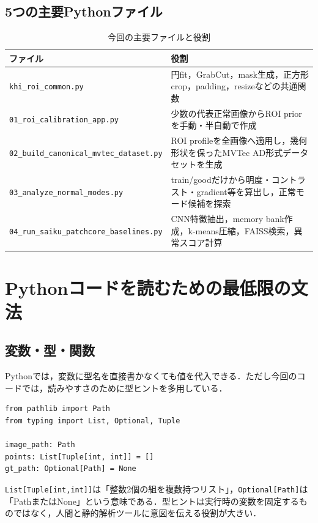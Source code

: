 \documentclass[a4paper,11pt]{ltjsreport}
\begin{document}
\section{5つの主要Pythonファイル}
\begin{table}[H]
\centering
\caption{今回の主要ファイルと役割}
\begin{tabularx}{\linewidth}{L{75mm} Y}
\toprule
ファイル & 役割 \\
\midrule
\texttt{khi\_roi\_common.py} & 円fit，GrabCut，mask生成，正方形crop，padding，resizeなどの共通関数 \\
\texttt{01\_roi\_calibration\_app.py} & 少数の代表正常画像からROI priorを手動・半自動で作成 \\
\texttt{02\_build\_canonical\_mvtec\_dataset.py} & ROI profileを全画像へ適用し，幾何形状を保ったMVTec AD形式データセットを生成 \\
\texttt{03\_analyze\_normal\_modes.py} & train/goodだけから明度・コントラスト・gradient等を算出し，正常モード候補を探索 \\
\texttt{04\_run\_saiku\_patchcore\_baselines.py} & CNN特徴抽出，memory bank作成，k-means圧縮，FAISS検索，異常スコア計算 \\
\bottomrule
\end{tabularx}
\end{table}

\chapter{Pythonコードを読むための最低限の文法}

\section{変数・型・関数}
Pythonでは，変数に型名を直接書かなくても値を代入できる．ただし今回のコードでは，読みやすさのために型ヒントを多用している．

\begin{lstlisting}
from pathlib import Path
from typing import List, Optional, Tuple

image_path: Path
points: List[Tuple[int, int]] = []
gt_path: Optional[Path] = None
\end{lstlisting}

\texttt{List[Tuple[int,int]]}は「整数2個の組を複数持つリスト」，\texttt{Optional[Path]}は「PathまたはNone」という意味である．型ヒントは実行時の変数を固定するものではなく，人間と静的解析ツールに意図を伝える役割が大きい．
\end{document}
